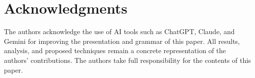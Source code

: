 \section*{Acknowledgments}

The authors acknowledge the use of AI tools such as ChatGPT, Claude,
and Gemini for improving the presentation and grammar of this paper.
All results, analysis, and proposed techniques remain a concrete
representation of the authors' contributions.
The authors take full responsibility for the contents of this paper.
